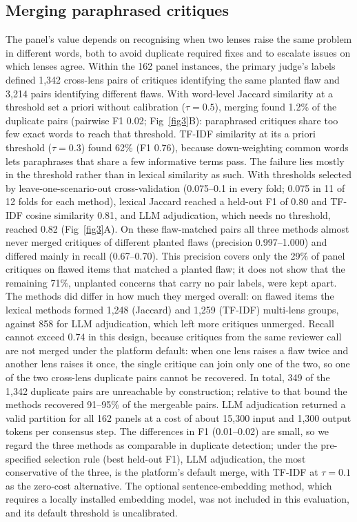 \subsection*{Merging paraphrased critiques}

The panel's value depends on recognising when two lenses raise the same problem in different words, both to avoid duplicate required fixes and to escalate issues on which lenses agree. Within the 162 panel instances, the primary judge's labels defined 1,342 cross-lens pairs of critiques identifying the same planted flaw and 3,214 pairs identifying different flaws. With word-level Jaccard similarity at a threshold set a priori without calibration ($\tau=0.5$), merging found 1.2\% of the duplicate pairs (pairwise F1 0.02; Fig~\ref{fig3}B): paraphrased critiques share too few exact words to reach that threshold. TF-IDF similarity at its a priori threshold ($\tau=0.3$) found 62\% (F1 0.76), because down-weighting common words lets paraphrases that share a few informative terms pass. The failure lies mostly in the threshold rather than in lexical similarity as such. With thresholds selected by leave-one-scenario-out cross-validation (0.075--0.1 in every fold; 0.075 in 11 of 12 folds for each method), lexical Jaccard reached a held-out F1 of 0.80 and TF-IDF cosine similarity 0.81, and LLM adjudication, which needs no threshold, reached 0.82 (Fig~\ref{fig3}A). On these flaw-matched pairs all three methods almost never merged critiques of different planted flaws (precision 0.997--1.000) and differed mainly in recall (0.67--0.70). This precision covers only the 29\% of panel critiques on flawed items that matched a planted flaw; it does not show that the remaining 71\%, unplanted concerns that carry no pair labels, were kept apart. The methods did differ in how much they merged overall: on flawed items the lexical methods formed 1,248 (Jaccard) and 1,259 (TF-IDF) multi-lens groups, against 858 for LLM adjudication, which left more critiques unmerged. Recall cannot exceed 0.74 in this design, because critiques from the same reviewer call are not merged under the platform default: when one lens raises a flaw twice and another lens raises it once, the single critique can join only one of the two, so one of the two cross-lens duplicate pairs cannot be recovered. In total, 349 of the 1,342 duplicate pairs are unreachable by construction; relative to that bound the methods recovered 91--95\% of the mergeable pairs. LLM adjudication returned a valid partition for all 162 panels at a cost of about 15,300 input and 1,300 output tokens per consensus step. The differences in F1 (0.01--0.02) are small, so we regard the three methods as comparable in duplicate detection; under the pre-specified selection rule (best held-out F1), LLM adjudication, the most conservative of the three, is the platform's default merge, with TF-IDF at $\tau=0.1$ as the zero-cost alternative. The optional sentence-embedding method, which requires a locally installed embedding model, was not included in this evaluation, and its default threshold is uncalibrated.

